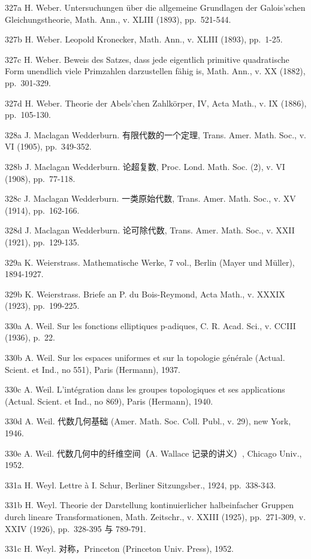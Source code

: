 327a H. Weber. Untersuchungen über die allgemeine Grundlagen der Galois'schen Gleichungstheorie, Math. Ann., v. XLIII (1893), pp.~521-544.

327b H. Weber. Leopold Kronecker, Math. Ann., v. XLIII (1893), pp.~1-25.

327c H. Weber. Beweis des Satzes, dass jede eigentlich primitive quadratische Form unendlich viele Primzahlen darzustellen fähig is, Math. Ann., v. XX (1882), pp.~301-329.

327d H. Weber. Theorie der Abels'chen Zahlkörper, IV, Acta Math., v. IX (1886), pp.~105-130.

328a J. Maclagan Wedderburn. 有限代数的一个定理, Trans. Amer. Math. Soc., v. VI (1905), pp.~349-352.

328b J. Maclagan Wedderburn. 论超复数, Proc. Lond. Math. Soc. (2), v. VI (1908), pp.~77-118.

328c J. Maclagan Wedderburn. 一类原始代数, Trans. Amer. Math. Soc., v. XV (1914), pp.~162-166.

328d J. Maclagan Wedderburn. 论可除代数, Trans. Amer. Math. Soc., v. XXII (1921), pp.~129-135.

329a K. Weierstrass. Mathematische Werke, 7 vol., Berlin (Mayer und Müller), 1894-1927.

329b K. Weierstrass. Briefe an P. du Bois-Reymond, Acta Math., v. XXXIX (1923), pp.~199-225.

330a A. Weil. Sur les fonctions elliptiques p-adiques, C. R. Acad. Sci., v. CCIII (1936), p.~22.

330b A. Weil. Sur les espaces uniformes et sur la topologie générale (Actual. Scient. et Ind., no 551), Paris (Hermann), 1937.

330c A. Weil. L'intégration dans les groupes topologiques et ses applications (Actual. Scient. et Ind., no 869), Paris (Hermann), 1940.

330d A. Weil. 代数几何基础 (Amer. Math. Soc. Coll. Publ., v. 29), new York, 1946.

330e A. Weil. 代数几何中的纤维空间（A. Wallace 记录的讲义）, Chicago Univ., 1952.

331a H. Weyl. Lettre à I. Schur, Berliner Sitzungsber., 1924, pp.~338-343.

331b H. Weyl. Theorie der Darstellung kontinuierlicher halbeinfacher Gruppen durch lineare Transformationen, Math. Zeitschr., v. XXIII (1925), pp.~271-309, v. XXIV (1926), pp.~328-395 与 789-791.

331c H. Weyl. 对称，Princeton (Princeton Univ. Press), 1952.

